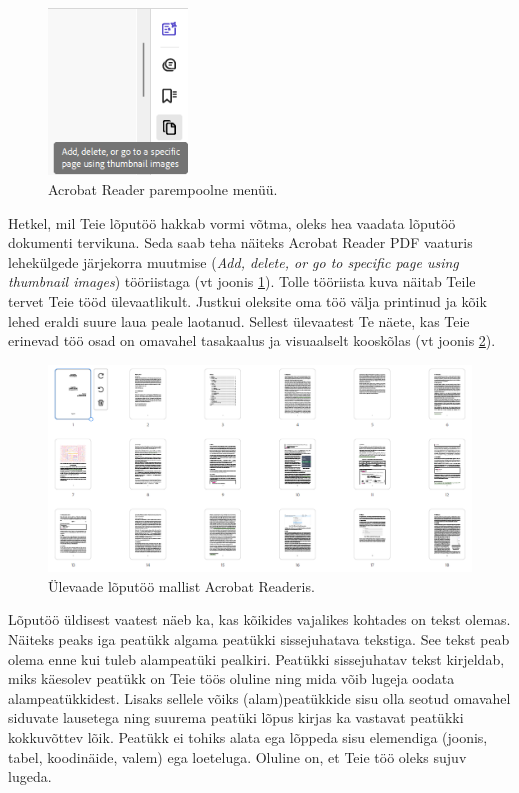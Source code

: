 \begin{figure}
    \centering
    \captionsetup{justification=centering}
    \includegraphics[width=0.33\textwidth]{figures/Joonis5-AcrobatReaderMenüü.png}
    \caption{Acrobat Reader parempoolne menüü.}
    \label{fig:acrobatReaderMenüü}
\end{figure}
Hetkel, mil Teie lõputöö hakkab vormi võtma, oleks hea vaadata lõputöö dokumenti tervikuna. Seda saab teha näiteks Acrobat Reader PDF vaaturis lehekülgede järjekorra muutmise (\emph{Add, delete, or go to specific page using thumbnail images}) tööriistaga (vt joonis \ref{fig:acrobatReaderMenüü}). Tolle tööriista kuva näitab Teile tervet Teie tööd ülevaatlikult. Justkui oleksite oma töö välja printinud ja kõik lehed eraldi suure laua peale laotanud. Sellest ülevaatest Te näete, kas Teie erinevad töö osad on omavahel tasakaalus ja visuaalselt kooskõlas (vt joonis \ref{fig:acrobatReaderÜlevaade}).

\begin{figure}[htb!]
    \centering
    \captionsetup{justification=centering}
    \includegraphics[width=\textwidth]{figures/Joonis6-AcrobatReaderKuva.png}
    \caption{Ülevaade lõputöö mallist Acrobat Readeris.}
    \label{fig:acrobatReaderÜlevaade}
\end{figure}
Lõputöö üldisest vaatest näeb ka, kas kõikides vajalikes kohtades on tekst olemas. Näiteks peaks iga peatükk algama peatükki sissejuhatava tekstiga. See tekst peab olema enne kui tuleb alampeatüki pealkiri. Peatükki sissejuhatav tekst kirjeldab, miks käesolev peatükk on Teie töös oluline ning mida võib lugeja oodata alampeatükkidest. Lisaks sellele võiks (alam)peatükkide sisu olla seotud omavahel siduvate lausetega ning suurema peatüki lõpus kirjas ka vastavat peatükki kokkuvõttev lõik. Peatükk ei tohiks alata ega lõppeda sisu elemendiga (joonis, tabel, koodinäide, valem) ega loeteluga. Oluline on, et Teie töö oleks sujuv lugeda.

